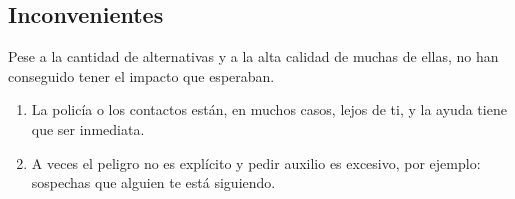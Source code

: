 \subsection{Inconvenientes}
Pese a la cantidad de alternativas y a la alta calidad de muchas de ellas, no han conseguido tener el impacto que esperaban.
\begin{enumerate}
  \item La policía o los contactos están, en muchos casos, lejos de ti, y la ayuda tiene que ser inmediata.
  \item A veces el peligro no es explícito y pedir auxilio es excesivo, por ejemplo: sospechas que alguien te está siguiendo.
\end{enumerate}


